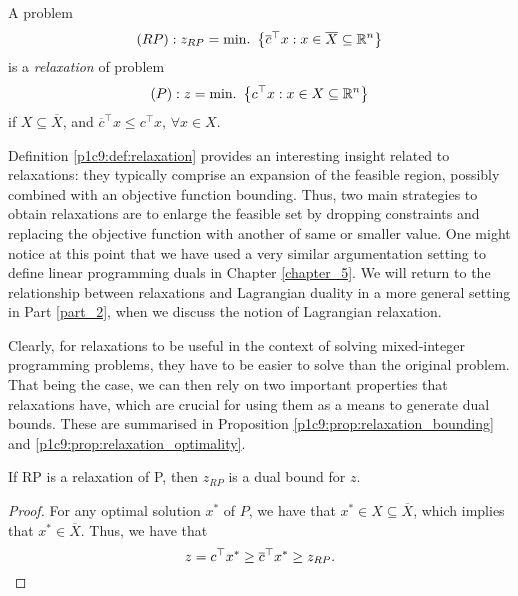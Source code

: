 \begin{definition}[Relaxation] \label{p1c9:def:relaxation}
	A problem 
	\begin{equation*}
	  (RP): z_{RP} = \mathop{\text{min.~}} \left\{ \overline{c}^\top x : x \in \overline{X} \subseteq \mathbb{R}^n \right \} 
	\end{equation*}
%
	is a \emph{relaxation} of problem
	\begin{equation*}
	  (P): z = \mathop{\text{min.~}} \left\{ c^\top x : x \in X \subseteq \mathbb{R}^n \right \} 
	\end{equation*}
	if $X \subseteq \overline{X}$, and $\overline{c}^\top x \leq c^\top x$, $\forall x \in X$.
\end{definition}

Definition \ref{p1c9:def:relaxation} provides an interesting insight related to relaxations: they typically comprise an expansion of the feasible region, possibly combined with an objective function bounding. Thus, two main strategies to obtain relaxations are to enlarge the feasible set by dropping constraints and replacing the objective function with another of same or smaller value. One might notice at this point that we have used a very similar argumentation setting to define linear programming duals in Chapter \ref{chapter_5}. We will return to the relationship between relaxations and Lagrangian duality in a more general setting in Part \ref{part_2}, when we discuss the notion of Lagrangian relaxation.

Clearly, for relaxations to be useful in the context of solving mixed-integer programming problems, they have to be easier to solve than the original problem. That being the case, we can then rely on two important properties that relaxations have, which are crucial for using them as a means to generate dual bounds. These are summarised in Proposition \ref{p1c9:prop:relaxation_bounding} and \ref{p1c9:prop:relaxation_optimality}.

\begin{proposition} \label{p1c9:prop:relaxation_bounding}
	If RP is a relaxation of P, then $z_{RP}$ is a dual bound for $z$. 
\end{proposition}
    
\begin{proof} For any optimal solution $x^*$ of $P$, we have that $x^* \in X \subseteq \overline{X}$, which implies that $x^* \in \overline{X}$. Thus, we have that
  \begin{equation*}
  	 z = c^\top x^* \geq \overline{c}^\top x^* \geq z_{RP}.	\qedhere
  \end{equation*}
\end{proof}

